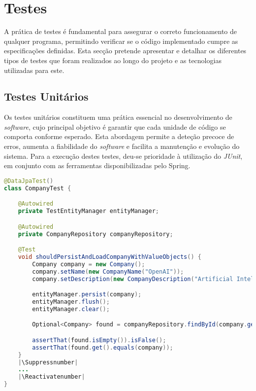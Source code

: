 \section{Testes}

A prática de testes é fundamental para assegurar o correto funcionamento de qualquer programa, permitindo verificar se o código implementado cumpre as especificações definidas. Esta secção pretende apresentar e detalhar os diferentes tipos de testes que foram realizados ao longo do projeto e as tecnologias utilizadas para este.

\subsection{Testes Unitários}

Os testes unitários constituem uma prática essencial no desenvolvimento de \textit{software}, cujo principal objetivo é garantir que cada unidade de código se comporta conforme esperado. Esta abordagem permite a deteção precoce de erros, aumenta a fiabilidade do \textit{software} e facilita a manutenção e evolução do sistema. Para a execução destes testes, deu-se prioridade à utilização do \textit{JUnit}, em conjunto com as ferramentas disponibilizadas pelo \gls{Spring}.

\begin{lstlisting}[language=Java, label={lst:class-CompanyTest}, caption={Class \textit{CompanyTest} - Exemplificação de testes Unitários}]
@DataJpaTest()
class CompanyTest {

    @Autowired
    private TestEntityManager entityManager;

    @Autowired
    private CompanyRepository companyRepository;

    @Test
    void shouldPersistAndLoadCompanyWithValueObjects() {
        Company company = new Company();
        company.setName(new CompanyName("OpenAI"));
        company.setDescription(new CompanyDescription("Artificial Intelligence Research"));

        entityManager.persist(company);
        entityManager.flush();
        entityManager.clear();

        Optional<Company> found = companyRepository.findById(company.getIid());

        assertThat(found.isEmpty()).isFalse();
        assertThat(found.get().equals(company));
    }
    |\Suppressnumber|
    ...
    |\Reactivatenumber|
}
\end{lstlisting}

